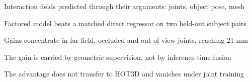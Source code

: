 \item Interaction fields predicted through their arguments: joints, object pose, mesh
\item Factored model beats a matched direct regressor on two held-out subject pairs
\item Gains concentrate in far-field, occluded and out-of-view joints, reaching 21 mm
\item The gain is carried by geometric supervision, not by inference-time fusion
\item The advantage does not transfer to HOT3D and vanishes under joint training
